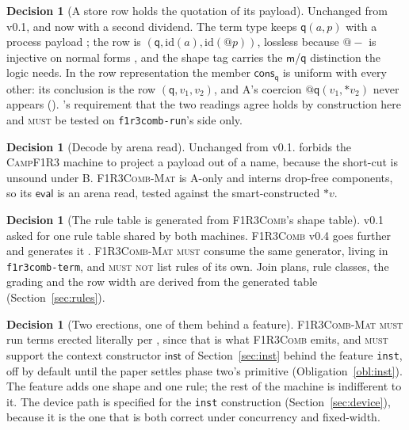 \documentclass[11pt,a4paper]{article}
\makeatletter
\newcommand{\code}[1]{\texttt{#1}}
\newcommand{\Comb}{\textsc{F1R3Comb}}
\newcommand{\Mat}{\textsc{F1R3Comb-Mat}}
\newcommand{\Camp}{\textsc{CampF1R3}}
\newcommand{\MUST}{\textsc{must}}
\newcommand{\MUSTNOT}{\textsc{must not}}
\newcommand{\quo}[1]{@#1}
\newcommand{\drp}[1]{{*}#1}
\newcommand{\mm}{\mathsf{m}}
\newcommand{\qq}{\mathsf{q}}
\newcommand{\cons}{\mathsf{cons}}
\theoremstyle{definition}
\newtheorem{decision}[definition]{Decision}
\theoremstyle{plain}
\newcommand{\inst}{\mathsf{inst}}
\makeatother
\begin{document}
\begin{decision}[A store row holds the quotation of its payload]
\label{dec:qrow}
Unchanged from v0.1, and now with a second dividend. The term type keeps
$\qq(a,p)$ with a process payload \cite[Dec.~2.1]{combspec}; the row is
$(\qq,\mathrm{id}(a),\mathrm{id}(\quo{p}))$, lossless because $\quo{-}$ is
injective on normal forms \cite[Prop.~2.10]{logic}, and the shape tag carries
the $\mm$/$\qq$ distinction the logic needs. In the row representation the
member $\cons_{\qq}$ \cite[Def.~3.8]{draft3} is uniform with every other: its
conclusion is the row $(\qq,v_{1},v_{2})$, and A's coercion
$\quo{\qq(v_{1},\drp{v_{2}})}$ \cite[Rem.~3.9]{draft3} never appears
(\cite[Rem.~3.1]{matnote}). \cite[Req.~4.8]{combspec}'s requirement that the
two readings agree holds by construction here and \MUST{} be tested on
\code{f1r3comb-run}'s side only.
\end{decision}

\begin{decision}[Decode by arena read]\label{dec:decode}
Unchanged from v0.1. \cite[Req.~9.3]{combspec} forbids the \Camp{} machine to
project a payload out of a name, because the short-cut is unsound under B.
\Mat{} is A-only and interns drop-free components, so its $\mathsf{eval}$ is
an arena read, tested against the smart-constructed $\drp{v}$.
\end{decision}

\begin{decision}[The rule table is generated from \Comb's shape table]
\label{dec:ruletable}
v0.1 asked for one rule table shared by both machines. \Comb{} v0.4 goes
further and generates it \cite[Req.~4.5]{combspec}. \Mat{} \MUST{} consume the
same generator, living in \code{f1r3comb-term}, and \MUSTNOT{} list rules of
its own. Join plans, rule classes, the grading and the row width are derived
from the generated table (Section~\ref{sec:rules}).
\end{decision}

\begin{decision}[Two erections, one of them behind a feature]
\label{dec:twoerect}
\Mat{} \MUST{} run terms erected literally per \cite[Def.~6.8]{draft3}, since
that is what \Comb{} emits, and \MUST{} support the context constructor
$\inst$ of Section~\ref{sec:inst} behind the feature \code{inst}, off by
default until the paper settles phase two's primitive
(Obligation~\ref{obl:inst}). The feature adds one shape and one rule; the
rest of the machine is indifferent to it. The device path is specified for
the \code{inst} construction (Section~\ref{sec:device}), because it is the one
that is both correct under concurrency and fixed-width.
\end{decision}
\end{document}
